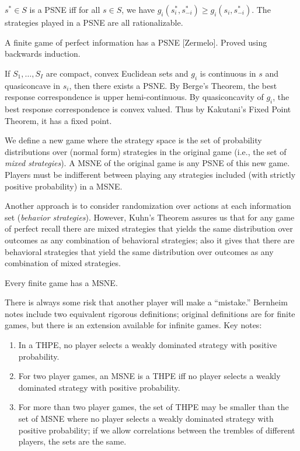 \documentclass[8pt,letterpaper, landscape]{extarticle} %
\begin{document}
\begin{multicols}{3}
\begin{description}
 $ s^* \in S $ is a PSNE iff for all $ s \in S $, we have $ g_i (s_i^* , s_{-i}^*) \geq g_i (s_i , s_{-i}^*) $. The strategies played in a PSNE are all rationalizable.

A finite game of perfect information has a PSNE [Zermelo]. Proved using backwards induction.

If $ S_1 , \dotsc , S_I $ are compact, convex Euclidean sets and $ g_i $ is continuous in $ s $ and quasiconcave in $ s_i $, then there exists a PSNE. By Berge's Theorem, the best response correspondence is upper hemi-continuous. By quasiconcavity of $ g_i $, the best response correspondence is convex valued. Thus by Kakutani's Fixed Point Theorem, it has a fixed point.

 We define a new game where the strategy space is the set of probability distributions over (normal form) strategies in the original game (i.e., the set of \textit{mixed strategies}). A MSNE of the original game is any PSNE of this new game. Players must be indifferent between playing any strategies included (with strictly positive probability) in a MSNE.

Another approach is to consider randomization over actions at each information set (\textit{behavior strategies}). However, Kuhn's Theorem assures us that for any game of perfect recall there are mixed strategies that yields the same distribution over outcomes as any combination of behavioral strategies; also it gives that there are behavioral strategies that yield the same distribution over outcomes as any combination of mixed strategies.

Every finite game has a MSNE.

 There is always some risk that another player will make a ``mistake.'' Bernheim notes include two equivalent rigorous definitions; original definitions are for finite games, but there is an extension available for infinite games. Key notes:
\begin{enumerate}
\item In a THPE, no player selects a weakly dominated strategy with positive probability.
\item For two player games, an MSNE is a THPE iff no player selects a weakly dominated strategy with positive probability.
\item For more than two player games, the set of THPE may be smaller than the set of MSNE where no player selects a weakly dominated strategy with positive probability; if we allow correlations between the trembles of different players, the sets are the same.
\end{enumerate}


\end{description}
\end{multicols}
\end{document}

